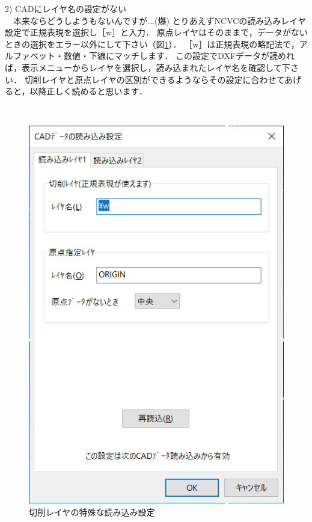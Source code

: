 \begin{minipage}[t]{0.48\textwidth}
2) CADにレイヤ名の設定がない\label{sec:ReadSetup}\\
　本来ならどうしようもないんですが...(爆)
とりあえずNCVCの読み込みレイヤ設定で正規表現を選択し［\yen{}w］と入力．
原点レイヤはそのままで，データがないときの選択をエラー以外にして下さい（図\ref{fig:ReadSetupFAQ.png}）．
［\yen{}w］は正規表現の略記法で，アルファベット・数値・下線にマッチします．
この設定でDXFデータが読めれば，表示メニューからレイヤを選択し，読み込まれたレイヤ名を確認して下さい．
切削レイヤと原点レイヤの区別ができるようならその設定に合わせてあげると，以降正しく読めると思います．
\end{minipage}
\begin{minipage}[t]{0.02\textwidth}
　
\end{minipage}
\begin{minipage}[t]{0.5\textwidth}
\vspace*{-2zh}
\begin{figure}[H]
\centering
\includegraphics[width=\textwidth]{No7/fig/ReadSetupFAQ.png}
\caption{切削レイヤの特殊な読み込み設定}
\label{fig:ReadSetupFAQ.png}
\end{figure}
\end{minipage}

